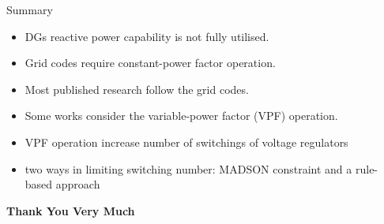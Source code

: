 \documentclass[10pt]{beamer}
\begin{document}
\begin{frame}{Summary}
  \begin{itemize}
  \item DGs reactive power capability is not fully utilised.
  \item Grid codes require  constant-power factor operation.
  \item Most published research follow the grid codes.
  \item Some works consider the variable-power  factor (VPF) operation.
  \item VPF operation increase number of switchings of voltage regulators
  \item two ways in limiting switching number: MADSON constraint and a rule-based approach

  \end{itemize}  
\end{frame}

\begin{frame}
\begin{center}
\textbf{Thank You Very Much}
\maketitle
\end{center}

\end{frame}
\end{document}
